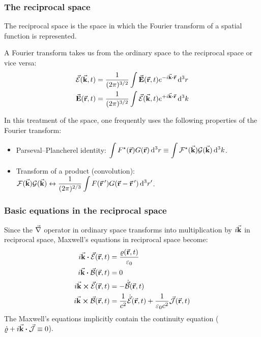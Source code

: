 \subsubsection*{The reciprocal space}
The reciprocal space is the space in which the Fourier transform of a spatial function is represented.
\begin{defi}
	A Fourier transform takes us from the ordinary space to the reciprocal space or vice versa:
	\begin{subequations}
	\begin{align}
		\vare{E}(\va{k}, t) &= \frac{1}{(2\pi)^{3/2}} \int \va{E}(\va{r}, t) e^{-i \va{k} \vdot \va{r}} \dd[3]{r} \\
		\va{E}(\va{r}, t) &= \frac{1}{(2\pi)^{3/2}} \int \vare{E}(\va{k}, t) e^{+i \va{k} \vdot \va{r}} \dd[3]{k}
	\end{align}
	\end{subequations}
\end{defi}
In this treatment of the space, one frequently uses the following properties of the Fourier transform:
\begin{itemize}
	\item Parseval--Plancherel identity: $\displaystyle \int F^{\star}{}(\va{r}) G(\va{r}) \dd[3]{r} \equiv \int \mathcal{F}^{\star}{}(\va{k}) \mathcal{G}(\va{k}) \dd[3]{k}$.
	\item Transform of a product (convolution): $\displaystyle \mathcal{F}(\va{k})\mathcal{G}(\va{k}) \leftrightarrow \frac{1}{(2\pi)^{2/3}} \int F(\va{r}\,') G(\va{r} - \va{r}\,') \dd[3]{r'}$.
\end{itemize}

\subsubsection*{Basic equations in the reciprocal space}
Since the $\vec{\nabla}$ operator in ordinary space transforms into multiplication by $i \va{k}$ in reciprocal space, Maxwell's equations in reciprocal space become:
\begin{subequations}
\begin{align}
	i\va{k} \vdot \vare{E}(\va{r}, t) &= \frac{\varrho(\va{r}, t)}{\varepsilon_{0}} \\
	i\va{k} \vdot \vare{B}(\va{r}, t) &= 0 \\
	i\va{k} \cross \vare{E}(\va{r}, t) &= - \dot{\vare{B}}(\va{r}, t) \\
	i\va{k} \cross \vare{B}(\va{r}, t) &= \frac{1}{c^{2}} \dot{\vare{E}}(\va{r}, t) + \frac{1}{\varepsilon_{0} c^{2}} \vare{J}(\va{r}, t)
\end{align}
\end{subequations}
The Maxwell's equations implicitly contain the continuity equation ($\dot{\varrho} + i\va{k} \vdot \vare{J} \equiv 0$).

